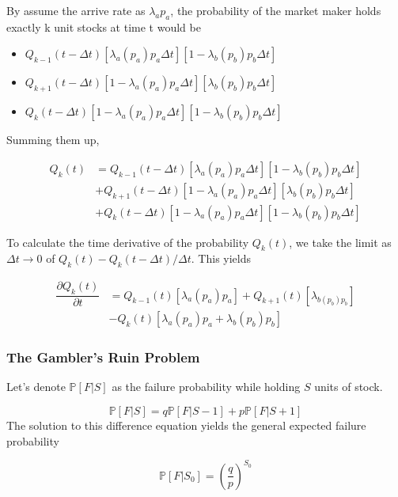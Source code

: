 \documentclass[a4]{article}
\begin{document}
By assume the arrive rate as $\lambda_{a}p_{a}$, the probability of the market maker holds exactly k unit stocks at time t would be\par 
\begin{itemize}
	\item $ Q_{k-1}(t - \Delta t)[\lambda _{a}(p_{a})p_{a}\Delta t][1-\lambda_{b}(p_{b})p_{b}\Delta t]$
	\item  $ Q_{k+1}(t - \Delta t)[1-\lambda _{a}(p_{a})p_{a}\Delta t][\lambda_{b}(p_{b})p_{b}\Delta t]$
	\item  $ Q_{k}(t - \Delta t)[1-\lambda _{a}(p_{a})p_{a}\Delta t][1-\lambda_{b}(p_{b})p_{b}\Delta t]$
\end{itemize}\par 
Summing them up,\par 
$$
\begin{aligned}
Q_{k}(t) &=  Q_{k-1}(t - \Delta t)[\lambda _{a}(p_{a})p_{a}\Delta t][1-\lambda_{b}(p_{b})p_{b}\Delta t] \\
& + Q_{k+1}(t - \Delta t)[1-\lambda _{a}(p_{a})p_{a}\Delta t][\lambda_{b}(p_{b})p_{b}\Delta t]\\
& + Q_{k}(t - \Delta t)[1-\lambda _{a}(p_{a})p_{a}\Delta t][1-\lambda_{b}(p_{b})p_{b}\Delta t]
\end{aligned}
$$\par 
To calculate the time derivative of the probability $Q_{k}(t)$, we take the limit as $\Delta t\rightarrow0$ of $Q_{k}(t) - Q_{k}(t-\Delta t)/\Delta t$. This yields\par 
$$
\begin{aligned}
\dfrac{\partial Q_{k}(t)}{\partial t} &= Q_{k-1}(t)[\lambda_{a}(p_{a})p_{a}] + Q_{k+1}(t)[\lambda_{b(p_{b})p_{b}}]\\&-Q_{k}(t)[\lambda_{a}(p_{a})p_{a}+\lambda_{b}(p_{b})p_{b}]
\end{aligned}
$$
\subsubsection{The Gambler's Ruin Problem}
\label{Gambler Ruin Problem}
Let's denote $\mathbb{P}[F|S]$ as the failure probability while holding $S$ units of stock.\par 
$$
\mathbb{P}[F|S] = q\mathbb{P}[F|S-1] + p\mathbb{P}[F|S+1]
$$
The solution to this difference equation yields the general expected failure probability\par 
$$
\mathbb{P}[F|S_{0}] = \left(\dfrac{q}{p}\right)^{S_{0}}
$$
\end{document}
